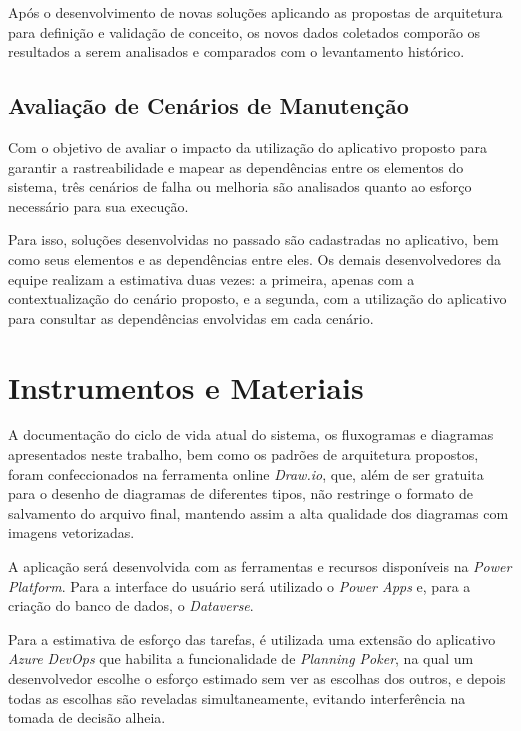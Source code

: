 	Após o desenvolvimento de novas soluções aplicando as propostas de arquitetura para definição e validação de conceito, os novos dados coletados comporão os resultados a serem analisados e comparados com o levantamento histórico.

	\subsection{Avaliação de Cenários de Manutenção}

	Com o objetivo de avaliar o impacto da utilização do aplicativo proposto para garantir a rastreabilidade e mapear as dependências entre os elementos do sistema, três cenários de falha ou melhoria são analisados quanto ao esforço necessário para sua execução.

	Para isso, soluções desenvolvidas no passado são cadastradas no aplicativo, bem como seus elementos e as dependências entre eles. Os demais desenvolvedores da equipe realizam a estimativa duas vezes: a primeira, apenas com a contextualização do cenário proposto, e a segunda, com a utilização do aplicativo para consultar as dependências envolvidas em cada cenário.

	\section{Instrumentos e Materiais}

	A documentação do ciclo de vida atual do sistema, os fluxogramas e diagramas apresentados neste trabalho, bem como os padrões de arquitetura propostos, foram confeccionados na ferramenta online \textit{Draw.io}, que, além de ser gratuita para o desenho de diagramas de diferentes tipos, não restringe o formato de salvamento do arquivo final, mantendo assim a alta qualidade dos diagramas com imagens vetorizadas.

	A aplicação será desenvolvida com as ferramentas e recursos disponíveis na \textit{Power Platform}. Para a interface do usuário será utilizado o \textit{Power Apps} e, para a criação do banco de dados, o \textit{Dataverse}.

	Para a estimativa de esforço das tarefas, é utilizada uma extensão do aplicativo \textit{Azure DevOps} que habilita a funcionalidade de \textit{Planning Poker}, na qual um desenvolvedor escolhe o esforço estimado sem ver as escolhas dos outros, e depois todas as escolhas são reveladas simultaneamente, evitando interferência na tomada de decisão alheia.
